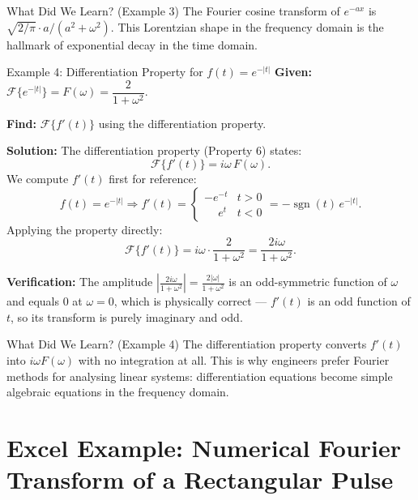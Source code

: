 \documentclass[12pt,a4paper]{article}
\begin{document}
\begin{learnbox}{What Did We Learn? (Example 3)}
The Fourier cosine transform of $e^{-ax}$ is $\sqrt{2/\pi}\cdot a/(a^2+\omega^2)$.
This Lorentzian shape in the frequency domain is the hallmark of exponential decay in the time domain.
\end{learnbox}

\vspace{0.8em}

\begin{infobox}{Example 4: Differentiation Property for $f(t) = e^{-|t|}$}
\textbf{Given:} $\mathcal{F}\{e^{-|t|}\} = F(\omega) = \dfrac{2}{1+\omega^2}$.

\textbf{Find:} $\mathcal{F}\{f'(t)\}$ using the differentiation property.

\textbf{Solution:}
The differentiation property (Property 6) states:
\[
  \mathcal{F}\{f'(t)\} = i\omega\, F(\omega).
\]
We compute $f'(t)$ first for reference:
\[
  f(t) = e^{-|t|} \Rightarrow f'(t) =
  \begin{cases}
    -e^{-t} & t > 0 \\
    \phantom{-}e^{t}  & t < 0
  \end{cases}
  = -\operatorname{sgn}(t)\,e^{-|t|}.
\]
Applying the property directly:
\[
  \mathcal{F}\{f'(t)\} = i\omega \cdot \frac{2}{1+\omega^2} = \frac{2i\omega}{1+\omega^2}.
\]

\textbf{Verification:} The amplitude $\left|\frac{2i\omega}{1+\omega^2}\right| = \frac{2|\omega|}{1+\omega^2}$
is an odd-symmetric function of $\omega$ and equals $0$ at $\omega=0$, which is physically correct ---
$f'(t)$ is an odd function of $t$, so its transform is purely imaginary and odd.
\end{infobox}

\begin{learnbox}{What Did We Learn? (Example 4)}
The differentiation property converts $f'(t)$ into $i\omega F(\omega)$ with no integration at all.
This is why engineers prefer Fourier methods for analysing linear systems: differentiation equations
become simple algebraic equations in the frequency domain.
\end{learnbox}

\section{Excel Example: Numerical Fourier Transform of a Rectangular Pulse}
\end{document}
